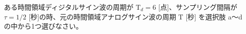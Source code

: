 ある時間領域ディジタルサイン波の周期が $\textrm{T}_d = 6$ [点]、サンプリング間隔が $\tau = 1/2$ [秒]の時、元の時間領域アナログサイン波の周期 $\textrm{T}$ [秒] を選択肢 a〜d の中から1つ選びなさい。

